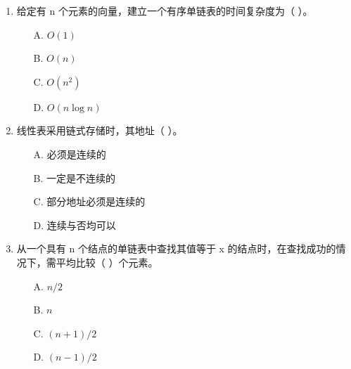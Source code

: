\documentclass[12pt, a4paper]{article}
\begin{document}
\begin{enumerate}
    \item 给定有 n 个元素的向量，建立一个有序单链表的时间复杂度为（ ）。
    \begin{enumerate}
        \item[A.] $O(1)$
        \item[B.] $O(n)$
        \item[C.] $O(n^2)$
        \item[D.] $O(n \log n)$
    \end{enumerate}
    
    \item 线性表采用链式存储时，其地址（ ）。
    \begin{enumerate}
        \item[A.] 必须是连续的
        \item[B.] 一定是不连续的
        \item[C.] 部分地址必须是连续的
        \item[D.] 连续与否均可以
    \end{enumerate}
    
    \item 从一个具有 n 个结点的单链表中查找其值等于 x 的结点时，在查找成功的情况下，需平均比较（ ）个元素。
    \begin{enumerate}
        \item[A.] $n/2$
        \item[B.] $n$
        \item[C.] $(n+1)/2$
        \item[D.] $(n-1)/2$
    \end{enumerate}
\end{enumerate}
\end{document}
